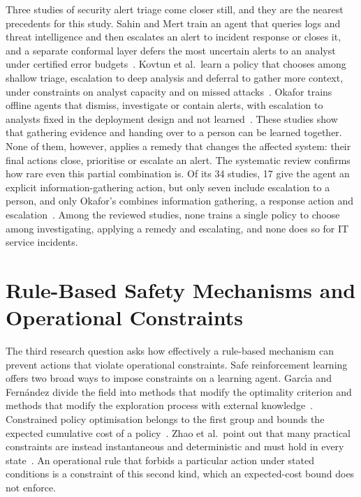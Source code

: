Three studies of security alert triage come closer still, and they are the nearest precedents for this study. Sahin and Mert train an agent that queries logs and threat intelligence and then escalates an alert to incident response or closes it, and a separate conformal layer defers the most uncertain alerts to an analyst under certified error budgets~\cite{sahin2026}. Kovtun et al.\ learn a policy that chooses among shallow triage, escalation to deep analysis and deferral to gather more context, under constraints on analyst capacity and on missed attacks~\cite{kovtun2026}. Okafor trains offline agents that dismiss, investigate or contain alerts, with escalation to analysts fixed in the deployment design and not learned~\cite{okafor2026}. These studies show that gathering evidence and handing over to a person can be learned together. None of them, however, applies a remedy that changes the affected system: their final actions close, prioritise or escalate an alert. The systematic review confirms how rare even this partial combination is. Of its 34 studies, 17 give the agent an explicit information-gathering action, but only seven include escalation to a person, and only Okafor's combines information gathering, a response action and escalation~\cite{opol2026slr}. Among the reviewed studies, none trains a single policy to choose among investigating, applying a remedy and escalating, and none does so for IT service incidents.

\section{Rule-Based Safety Mechanisms and Operational Constraints}

The third research question asks how effectively a rule-based mechanism can prevent actions that violate operational constraints. Safe reinforcement learning offers two broad ways to impose constraints on a learning agent. Garc\'{\i}a and Fern\'{a}ndez divide the field into methods that modify the optimality criterion and methods that modify the exploration process with external knowledge~\cite{garcia2015}. Constrained policy optimisation belongs to the first group and bounds the expected cumulative cost of a policy~\cite{achiam2017,wachi2024}. Zhao et al.\ point out that many practical constraints are instead instantaneous and deterministic and must hold in every state~\cite{zhao2023}. An operational rule that forbids a particular action under stated conditions is a constraint of this second kind, which an expected-cost bound does not enforce.


